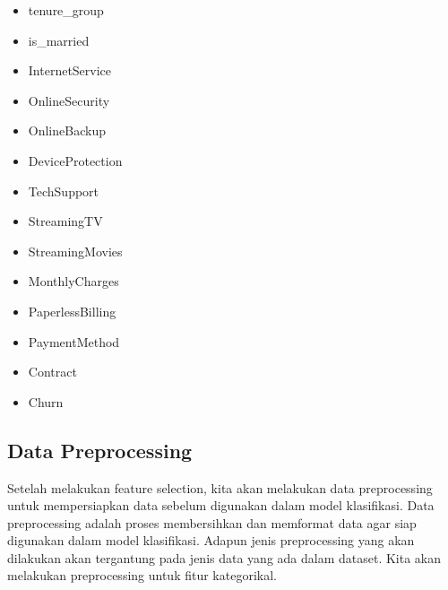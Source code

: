 \begin{itemize}
    \item tenure\_group
    \item is\_married
    \item InternetService
    \item OnlineSecurity
    \item OnlineBackup
    \item DeviceProtection
    \item TechSupport
    \item StreamingTV
    \item StreamingMovies
    \item MonthlyCharges
    \item PaperlessBilling
    \item PaymentMethod
    \item Contract
    \item Churn
\end{itemize}

\subsection{Data Preprocessing}
Setelah melakukan feature selection, kita akan melakukan data preprocessing untuk mempersiapkan data sebelum digunakan dalam model klasifikasi. Data preprocessing adalah proses membersihkan dan memformat data agar siap digunakan dalam model klasifikasi. Adapun jenis preprocessing yang akan dilakukan akan tergantung pada jenis data yang ada dalam dataset. Kita akan melakukan preprocessing untuk fitur kategorikal.

